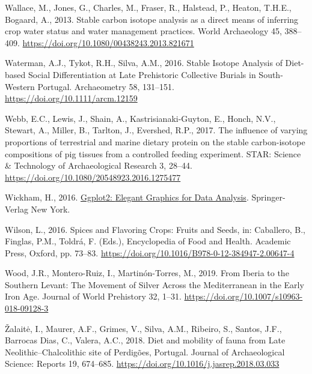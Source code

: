 \documentclass[preprint, 3p, authoryear]{elsarticle} %
\newlength{\cslhangindent}
\newlength{\cslentryspacingunit} %
\newenvironment{CSLReferences}[2] %
 {%
  \setlength{\parindent}{0pt}
  \ifodd #1
  \let\oldpar\par
  \def\par{\hangindent=\cslhangindent\oldpar}
  \fi
  \setlength{\parskip}{#2\cslentryspacingunit}
 }%
 {}
\begin{document}
\begin{CSLReferences}{1}{0}
\leavevmode{}%
Wallace, M., Jones, G., Charles, M., Fraser, R., Halstead, P., Heaton, T.H.E., Bogaard, A., 2013. Stable carbon isotope analysis as a direct means of inferring crop water status and water management practices. World Archaeology 45, 388--409. \url{https://doi.org/10.1080/00438243.2013.821671}

\leavevmode{}%
Waterman, A.J., Tykot, R.H., Silva, A.M., 2016. Stable {Isotope Analysis} of {Diet}-based {Social Differentiation} at {Late Prehistoric Collective Burials} in {South}-{Western Portugal}. Archaeometry 58, 131--151. \url{https://doi.org/10.1111/arcm.12159}

\leavevmode{}%
Webb, E.C., Lewis, J., Shain, A., Kastrisianaki-Guyton, E., Honch, N.V., Stewart, A., Miller, B., Tarlton, J., Evershed, R.P., 2017. The influence of varying proportions of terrestrial and marine dietary protein on the stable carbon-isotope compositions of pig tissues from a controlled feeding experiment. STAR: Science \& Technology of Archaeological Research 3, 28--44. \url{https://doi.org/10.1080/20548923.2016.1275477}

\leavevmode{}%
Wickham, H., 2016. \href{https://ggplot2.tidyverse.org}{Ggplot2: {Elegant Graphics} for {Data Analysis}}. {Springer-Verlag New York}.

\leavevmode{}%
Wilson, L., 2016. Spices and {Flavoring Crops}: {Fruits} and {Seeds}, in: Caballero, B., Finglas, P.M., Toldrá, F. (Eds.), Encyclopedia of {Food} and {Health}. {Academic Press}, {Oxford}, pp. 73--83. \url{https://doi.org/10.1016/B978-0-12-384947-2.00647-4}

\leavevmode{}%
Wood, J.R., Montero-Ruiz, I., Martinón-Torres, M., 2019. From {Iberia} to the {Southern Levant}: {The Movement} of {Silver Across} the {Mediterranean} in the {Early Iron Age}. Journal of World Prehistory 32, 1--31. \url{https://doi.org/10.1007/s10963-018-09128-3}

\leavevmode{}%
Žalaitė, I., Maurer, A.F., Grimes, V., Silva, A.M., Ribeiro, S., Santos, J.F., Barrocas Dias, C., Valera, A.C., 2018. Diet and mobility of fauna from {Late Neolithic}--{Chalcolithic} site of {Perdigões}, {Portugal}. Journal of Archaeological Science: Reports 19, 674--685. \url{https://doi.org/10.1016/j.jasrep.2018.03.033}

\end{CSLReferences}
\end{document}
